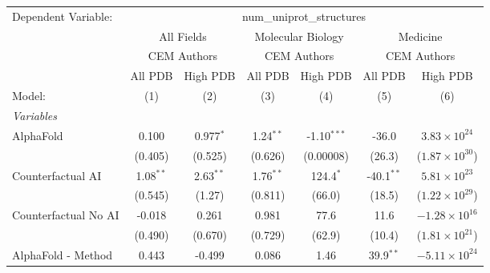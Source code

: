 \begingroup
\centering
\begin{tabular}{lcccccc}
   \tabularnewline \midrule \midrule
   Dependent Variable: & \multicolumn{6}{c}{num\_uniprot\_structures}\\
 & \multicolumn{2}{c}{All Fields} & \multicolumn{2}{c}{Molecular Biology} & \multicolumn{2}{c}{Medicine} \\
\cmidrule(lr){2-3} \cmidrule(lr){4-5} \cmidrule(lr){6-7}
 & \multicolumn{2}{c}{CEM Authors} & \multicolumn{2}{c}{CEM Authors} & \multicolumn{2}{c}{CEM Authors} \\
\cmidrule(lr){2-3} \cmidrule(lr){4-5} \cmidrule(lr){6-7}
 & \multicolumn{1}{c}{All PDB} & \multicolumn{1}{c}{High PDB} & \multicolumn{1}{c}{All PDB} & \multicolumn{1}{c}{High PDB} & \multicolumn{1}{c}{All PDB} & \multicolumn{1}{c}{High PDB} \\
\cmidrule(lr){2-2} \cmidrule(lr){3-3} \cmidrule(lr){4-4} \cmidrule(lr){5-5} \cmidrule(lr){6-6} \cmidrule(lr){7-7}
   Model:                                                     & (1)           & (2)         & (3)         & (4)           & (5)          & (6)\\  
   \midrule
   \emph{Variables}\\
   AlphaFold                                                  & 0.100         & 0.977$^{*}$ & 1.24$^{**}$ & -1.10$^{***}$ & -36.0        & $3.83\times 10^{24}$\\    
                                                              & (0.405)       & (0.525)     & (0.626)     & (0.00008)     & (26.3)       & ($1.87\times 10^{30}$)\\    
   Counterfactual AI                                          & 1.08$^{**}$   & 2.63$^{**}$ & 1.76$^{**}$ & 124.4$^{*}$   & -40.1$^{**}$ & $5.81\times 10^{23}$\\    
                                                              & (0.545)       & (1.27)      & (0.811)     & (66.0)        & (18.5)       & ($1.22\times 10^{29}$)\\    
   Counterfactual No AI                                       & -0.018        & 0.261       & 0.981       & 77.6          & 11.6         & $-1.28\times 10^{16}$\\    
                                                              & (0.490)       & (0.670)     & (0.729)     & (62.9)        & (10.4)       & ($1.81\times 10^{21}$)\\    
   AlphaFold - Method                                         & 0.443         & -0.499      & 0.086       & 1.46          & 39.9$^{**}$  & $-5.11\times 10^{24}$\\    

\end{tabular}
